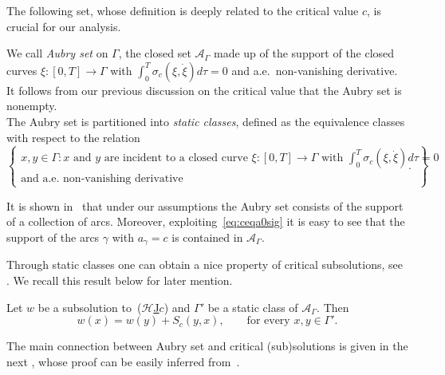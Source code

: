 \documentclass[11pt,a4paper,american]{article}
\newcommand{\Acal}{\mathcal A}
\newcommand{\Hcal}{\mathcal H}
\newcommand{\hrefc}{\textup{(}\hyperref[eq:globeik]{\ensuremath{\Hcal}\textup{J}\ensuremath{c}}\textup{)}}
\begin{document}
    The following set, whose definition is deeply related to the critical value $c$, is crucial for our analysis.

    \begin{defin}
        We call \emph{Aubry set} on $\Gamma$, the closed set $\Acal_\Gamma$ made up of the support of the closed curves $\xi:[0,T]\to\Gamma$ with $\int_0^T\sigma_c\left(\xi,\dot\xi\right)d\tau=0$ and a.e.\ non-vanishing derivative. It follows from our previous discussion on the critical value that the Aubry set is nonempty.\\
        The Aubry set is partitioned into \emph{static classes}, defined as the equivalence classes with respect to the relation
        \begin{equation*}
            \left\{
            \begin{gathered}
                x,y\in\Gamma:\text{$x$ and $y$ are incident to a closed curve $\xi:[0,T]\to\Gamma$ with }\int_0^T\sigma_c\left(\xi,\dot\xi\right)d\tau=0\\
                \text{and a.e.\ non-vanishing derivative}
            \end{gathered}
            \right\}.
        \end{equation*}
    \end{defin}

    \begin{rem}\label{arcaubry}
        It is shown in~\cite{SiconolfiSorrentino18} that under our assumptions the Aubry set consists of the support of a collection of arcs. Moreover, exploiting~\cref{eq:ceqa0sig} it is easy to see that the support of the arcs $\gamma$ with $a_\gamma=c$ is contained in $\Acal_\Gamma$.
    \end{rem}

    Through static classes one can obtain a nice property of critical subsolutions, see \cite[Theorem 7.5]{SiconolfiSorrentino18}. We recall this result below for later mention.

    \begin{prop}\label{subsolstatclass}
        Let $w$ be a subsolution to~\hrefc{} and $\Gamma'$ be a static class of $\Acal_\Gamma$. Then
        \begin{equation*}
            w(x)=w(y)+S_c(y,x),\qquad\text{for every }x,y\in\Gamma'.
        \end{equation*}
    \end{prop}

    The main connection between Aubry set and critical (sub)solutions is given in the next , whose proof can be easily inferred from~\cite{SiconolfiSorrentino18}.
\end{document}
